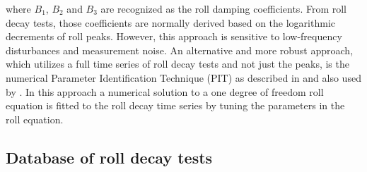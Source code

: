 




where $B_1$, $B_2$ and $B_3$ are recognized as the roll damping coefficients.
From roll decay tests, those coefficients are normally derived based on the logarithmic decrements of roll peaks. However, this approach is sensitive to low-frequency disturbances and measurement noise. An alternative and more robust approach, which utilizes a full time series of roll decay tests and not just the peaks, is the numerical Parameter Identification Technique (PIT) as described in \parencite{imo_1200_2006} and also used by \parencite{bulian_simplified_2004}. In this approach a numerical solution to a one degree of freedom roll equation is fitted to the roll decay time series by tuning the parameters in the roll equation.



\subsection{Database of roll decay tests}
\label{se:database_of_roll_decay_tests}




